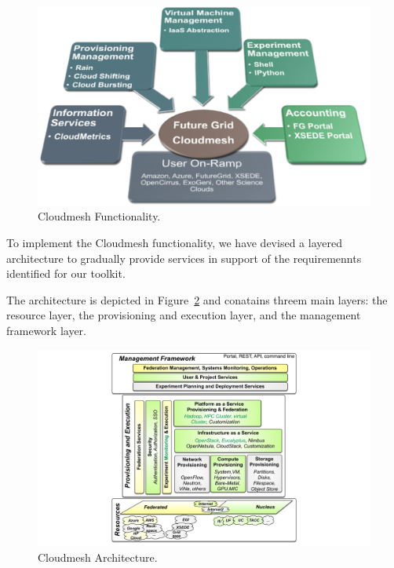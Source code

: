 \documentclass{tex/sig-alternate-2013}
\begin{document}
\begin{figure}[htb]
  \centering
    \includegraphics[width=1.0\columnwidth]{images/cm-functionality.pdf}
  \caption{Cloudmesh Functionality.}\label{F:cm-func}
\end{figure}

To implement the Cloudmesh functionality, we have devised a layered
architecture to gradually provide services in support of the
requiremennts identified for our toolkit. 

The architecture is depicted in Figure~\ref{F:arch} and conatains
threem main layers: the resource layer, the provisioning and execution
layer, and the management framework layer.

\begin{figure}[htb]
  \centering
    \includegraphics[width=1.0\columnwidth]{images/cm-arch.pdf}
    \vspace{-24pt}
  \caption{Cloudmesh Architecture.}\label{F:arch}
\end{figure}
\end{document}
